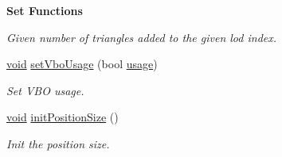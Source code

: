 \begin{Indent}{\bf Set Functions}
\begin{DoxyCompactItemize}
\begin{DoxyCompactList}\small\item\em Given number of triangles added to the given lod index. \end{DoxyCompactList}\item 
\hyperlink{group___u_a_v_objects_plugin_ga444cf2ff3f0ecbe028adce838d373f5c}{void} \hyperlink{class_g_l_c___mesh_data_aa5dc09b452837d65191c7cf7aafed66b}{set\-Vbo\-Usage} (bool \hyperlink{glext_8h_ae759ed0394ed5353d8bef2fb755305da}{usage})
\begin{DoxyCompactList}\small\item\em Set V\-B\-O usage. \end{DoxyCompactList}\item 
\hyperlink{group___u_a_v_objects_plugin_ga444cf2ff3f0ecbe028adce838d373f5c}{void} \hyperlink{class_g_l_c___mesh_data_a07f0c2e132d6359df8c930d174d3bab0}{init\-Position\-Size} ()
\begin{DoxyCompactList}\small\item\em Init the position size. \end{DoxyCompactList}\end{DoxyCompactItemize}
\end{Indent}
